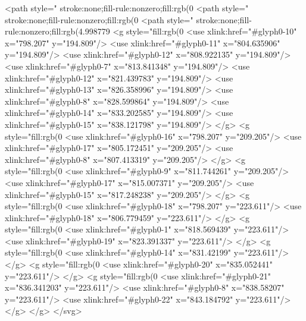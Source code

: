 <path style=" stroke:none;fill-rule:nonzero;fill:rgb(0%
<path style=" stroke:none;fill-rule:nonzero;fill:rgb(0%
<path style=" stroke:none;fill-rule:nonzero;fill:rgb(4.998779%
<g style="fill:rgb(0%
  <use xlink:href="#glyph0-10" x="798.207" y="194.809"/>
  <use xlink:href="#glyph0-11" x="804.635906" y="194.809"/>
  <use xlink:href="#glyph0-12" x="808.922135" y="194.809"/>
  <use xlink:href="#glyph0-7" x="813.841348" y="194.809"/>
  <use xlink:href="#glyph0-12" x="821.439783" y="194.809"/>
  <use xlink:href="#glyph0-13" x="826.358996" y="194.809"/>
  <use xlink:href="#glyph0-8" x="828.599864" y="194.809"/>
  <use xlink:href="#glyph0-14" x="833.202585" y="194.809"/>
  <use xlink:href="#glyph0-15" x="838.121798" y="194.809"/>
</g>
<g style="fill:rgb(0%
  <use xlink:href="#glyph0-16" x="798.207" y="209.205"/>
  <use xlink:href="#glyph0-17" x="805.172451" y="209.205"/>
  <use xlink:href="#glyph0-8" x="807.413319" y="209.205"/>
</g>
<g style="fill:rgb(0%
  <use xlink:href="#glyph0-9" x="811.744261" y="209.205"/>
  <use xlink:href="#glyph0-17" x="815.007371" y="209.205"/>
  <use xlink:href="#glyph0-15" x="817.248238" y="209.205"/>
</g>
<g style="fill:rgb(0%
  <use xlink:href="#glyph0-18" x="798.207" y="223.611"/>
  <use xlink:href="#glyph0-18" x="806.779459" y="223.611"/>
</g>
<g style="fill:rgb(0%
  <use xlink:href="#glyph0-1" x="818.569439" y="223.611"/>
  <use xlink:href="#glyph0-19" x="823.391337" y="223.611"/>
</g>
<g style="fill:rgb(0%
  <use xlink:href="#glyph0-14" x="831.42199" y="223.611"/>
</g>
<g style="fill:rgb(0%
  <use xlink:href="#glyph0-20" x="835.052441" y="223.611"/>
</g>
<g style="fill:rgb(0%
  <use xlink:href="#glyph0-21" x="836.341203" y="223.611"/>
  <use xlink:href="#glyph0-8" x="838.58207" y="223.611"/>
  <use xlink:href="#glyph0-22" x="843.184792" y="223.611"/>
</g>
</g>
</svg>
